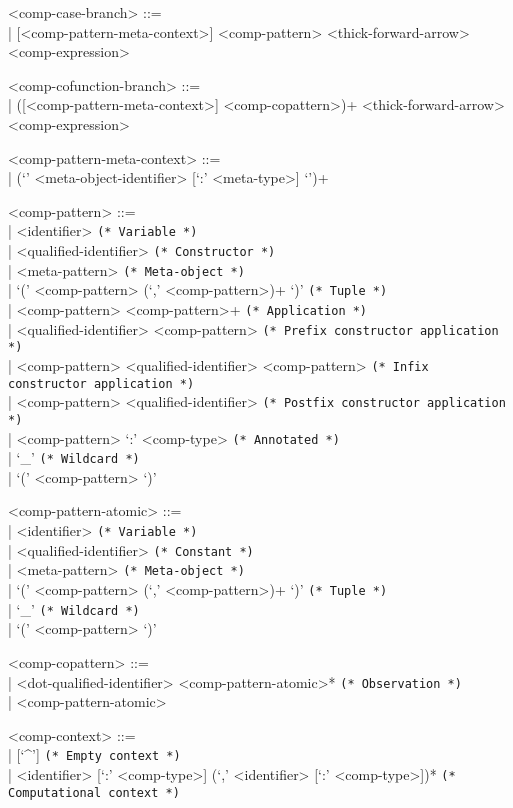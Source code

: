 \documentclass[11pt]{article}
\begin{document}
\begin{grammar}
<comp-case-branch> ::= \hfill\\
| [<comp-pattern-meta-context>] <comp-pattern> <thick-forward-arrow> <comp-expression>

<comp-cofunction-branch> ::= \hfill\\
| ([<comp-pattern-meta-context>] <comp-copattern>)+ <thick-forward-arrow> <comp-expression>

<comp-pattern-meta-context> ::= \hfill\\
| (`{' <meta-object-identifier> [`:' <meta-type>] `}')+

<comp-pattern> ::= \hfill\\
| <identifier> \hfill \texttt{(* Variable *)}\\
| <qualified-identifier> \hfill \texttt{(* Constructor *)}\\
| <meta-pattern> \hfill \texttt{(* Meta-object *)} \\
| `(' <comp-pattern> (`,' <comp-pattern>)+ `)' \hfill \texttt{(* Tuple *)}\\
| <comp-pattern> <comp-pattern>+ \hfill \texttt{(* Application *)}\\
| <qualified-identifier> <comp-pattern> \hfill \texttt{(* Prefix constructor application *)}\\
| <comp-pattern> <qualified-identifier> <comp-pattern> \hfill \texttt{(* Infix constructor application *)}\\
| <comp-pattern> <qualified-identifier> \hfill \texttt{(* Postfix constructor application *)}\\
| <comp-pattern> `:' <comp-type> \hfill \texttt{(* Annotated *)}\\
| `_' \hfill \texttt{(* Wildcard *)}\\
| `(' <comp-pattern> `)'

<comp-pattern-atomic> ::= \hfill\\
| <identifier> \hfill \texttt{(* Variable *)}\\
| <qualified-identifier> \hfill \texttt{(* Constant *)}\\
| <meta-pattern> \hfill \texttt{(* Meta-object *)} \\
| `(' <comp-pattern> (`,' <comp-pattern>)+ `)' \hfill \texttt{(* Tuple *)}\\
| `_' \hfill \texttt{(* Wildcard *)}\\
| `(' <comp-pattern> `)'

<comp-copattern> ::= \hfill\\
| <dot-qualified-identifier> <comp-pattern-atomic>* \hfill \texttt{(* Observation *)}\\
| <comp-pattern-atomic>

<comp-context> ::= \hfill\\
| [`^'] \hfill \texttt{(* Empty context *)}\\
| <identifier> [`:' <comp-type>] (`,' <identifier> [`:' <comp-type>])* \hfill \texttt{(* Computational context *)}
\end{grammar}
\end{document}
